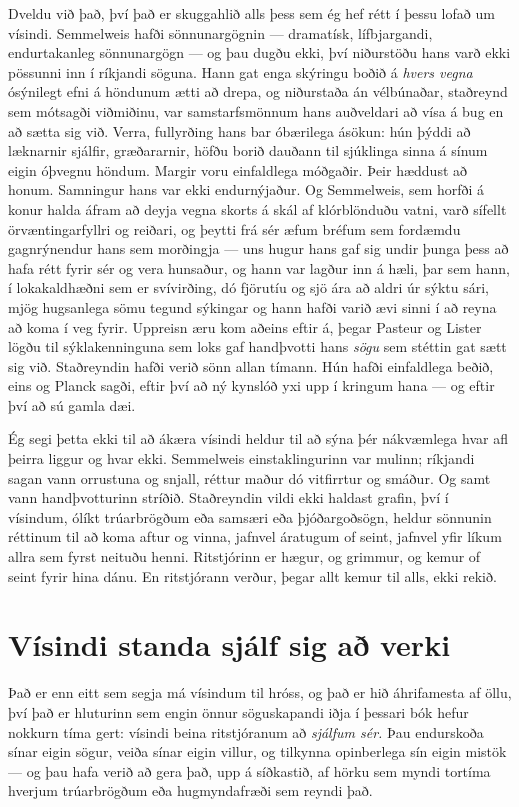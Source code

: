 Dveldu við það, því það er skuggahlið alls þess sem ég hef rétt í þessu lofað um vísindi. Semmelweis hafði sönnunargögnin — dramatísk, lífbjargandi, endurtakanleg sönnunargögn — og þau dugðu ekki, því niðurstöðu hans varð ekki pössunni inn í ríkjandi söguna. Hann gat enga skýringu boðið á \emph{hvers vegna} ósýnilegt efni á höndunum ætti að drepa, og niðurstaða án vélbúnaðar, staðreynd sem mótsagði viðmiðinu, var samstarfsmönnum hans auðveldari að vísa á bug en að sætta sig við. Verra, fullyrðing hans bar óbærilega ásökun: hún þýddi að læknarnir sjálfir, græðararnir, höfðu borið dauðann til sjúklinga sinna á sínum eigin óþvegnu höndum. Margir voru einfaldlega móðgaðir. Þeir hæddust að honum. Samningur hans var ekki endurnýjaður. Og Semmelweis, sem horfði á konur halda áfram að deyja vegna skorts á skál af klórblönduðu vatni, varð sífellt örvæntingarfyllri og reiðari, og þeytti frá sér æfum bréfum sem fordæmdu gagnrýnendur hans sem morðingja — uns hugur hans gaf sig undir þunga þess að hafa rétt fyrir sér og vera hunsaður, og hann var lagður inn á hæli, þar sem hann, í lokakaldhæðni sem er svívirðing, dó fjörutíu og sjö ára að aldri úr sýktu sári, mjög hugsanlega sömu tegund sýkingar og hann hafði varið ævi sinni í að reyna að koma í veg fyrir. Uppreisn æru kom aðeins eftir á, þegar Pasteur og Lister lögðu til sýklakenninguna sem loks gaf handþvotti hans \emph{sögu} sem stéttin gat sætt sig við. Staðreyndin hafði verið sönn allan tímann. Hún hafði einfaldlega beðið, eins og Planck sagði, eftir því að ný kynslóð yxi upp í kringum hana — og eftir því að sú gamla dæi.

Ég segi þetta ekki til að ákæra vísindi heldur til að sýna þér nákvæmlega hvar afl þeirra liggur og hvar ekki. Semmelweis einstaklingurinn var mulinn; ríkjandi sagan vann orrustuna og snjall, réttur maður dó vitfirrtur og smáður. Og samt vann handþvotturinn stríðið. Staðreyndin vildi ekki haldast grafin, því í vísindum, ólíkt trúarbrögðum eða samsæri eða þjóðargoðsögn, heldur sönnunin réttinum til að koma aftur og vinna, jafnvel áratugum of seint, jafnvel yfir líkum allra sem fyrst neituðu henni. Ritstjórinn er hægur, og grimmur, og kemur of seint fyrir hina dánu. En ritstjórann verður, þegar allt kemur til alls, ekki rekið.

\section*{Vísindi standa sjálf sig að verki}

Það er enn eitt sem segja má vísindum til hróss, og það er hið áhrifamesta af öllu, því það er hluturinn sem engin önnur söguskapandi iðja í þessari bók hefur nokkurn tíma gert: vísindi beina ritstjóranum að \emph{sjálfum sér.} Þau endurskoða sínar eigin sögur, veiða sínar eigin villur, og tilkynna opinberlega sín eigin mistök — og þau hafa verið að gera það, upp á síðkastið, af hörku sem myndi tortíma hverjum trúarbrögðum eða hugmyndafræði sem reyndi það.


